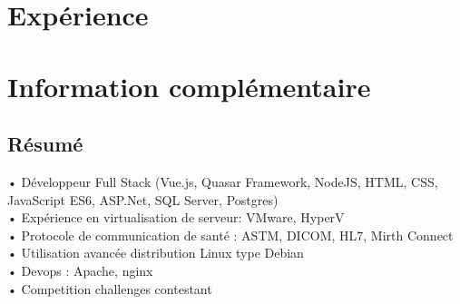 \documentclass[letterpaper]{twentysecondcvfr} %
\begin{document}

\section{Expérience}

\begin{twenty} %
\end{twenty}


\section{Information complémentaire}

\subsection{Résumé}

• Développeur Full Stack (Vue.js, Quasar Framework, NodeJS, HTML, CSS, JavaScript ES6, ASP.Net, SQL Server, Postgres)\\ 
• Expérience en virtualisation de serveur: VMware, HyperV \\
• Protocole de communication de santé : ASTM, DICOM, HL7, Mirth Connect\\
• Utilisation avancée distribution Linux type Debian\\
• Devops : Apache, nginx\\
• Competition challenges contestant


\end{document}
